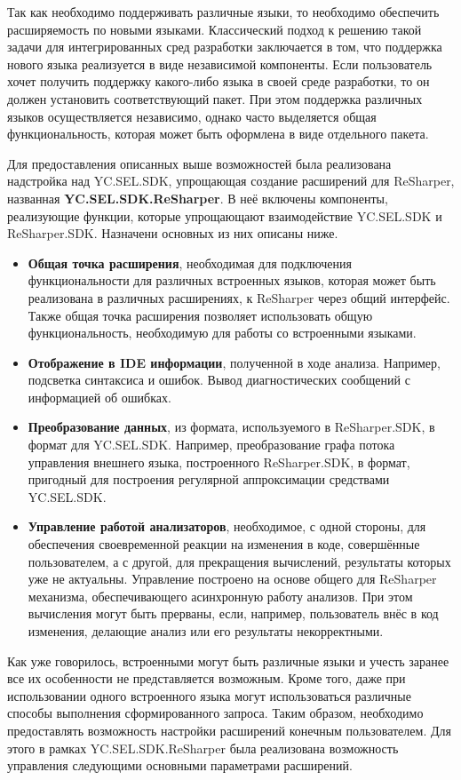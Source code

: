 Так как необходимо поддерживать различные языки, то необходимо обеспечить расширяемость по новыми языками. Классический подход к решению такой задачи для интегрированных сред разработки заключается в том, что поддержка нового языка реализуется в виде независимой компоненты. Если пользователь хочет получить поддержку какого-либо языка в своей среде разработки, то он должен установить соответствующий пакет. При этом поддержка различных языков осуществляется независимо, однако часто выделяется общая функциональность, которая может быть оформлена в виде отдельного пакета.

Для предоставления описанных выше возможностей была реализована надстройка над YC.SEL.SDK, упрощающая создание расширений для ReSharper, названная  \textbf{YC.SEL.SDK.ReSharper}. В неё включены компоненты, реализующие функции, которые упрощающают взаимодействие YC.SEL.SDK и ReSharper.SDK. Назначени основных из них описаны ниже.

\begin{itemize}
  \item \textbf{Общая точка расширения}, необходимая для подключения функциональности для различных встроенных языков, которая может быть реализована в различных расширениях, к ReSharper через общий интерфейс. Также общая точка расширения позволяет использовать общую функциональность, необходимую для работы со встроенными языками.
  \item \textbf{Отображение в IDE информации}, полученной в ходе анализа. Например, подсветка синтаксиса и ошибок. Вывод диагностических сообщений с информацией об ошибках.
  \item \textbf{Преобразование данных}, из формата, используемого в ReSharper.SDK, в формат для YC.SEL.SDK. Например, преобразование графа потока управления внешнего языка, построенного ReSharper.SDK, в формат, пригодный для построения регулярной аппроксимации средствами YC.SEL.SDK.
  \item \textbf{Управление работой анализаторов}, необходимое, с одной стороны, для обеспечения своевременной реакции на изменения в коде, совершённые пользователем, а с другой, для прекращения вычислений, результаты которых уже не актуальны. Управление построено на основе общего для ReSharper механизма, обеспечивающего асинхронную работу анализов. При этом вычисления могут быть прерваны, если, например, пользователь внёс в код изменения, делающие анализ или его результаты некорректными. 
\end{itemize}

Как уже говорилось, встроенными могут быть различные языки и учесть заранее все их особенности не представляется возможным. Кроме того, даже при использовании одного встроенного языка могут использоваться различные способы выполнения сформированного запроса. Таким образом, необходимо предоставлять возможность настройки расширений конечным пользователем. Для этого в рамках YC.SEL.SDK.ReSharper была реализована возможность управления следующими основными параметрами расширений. 


